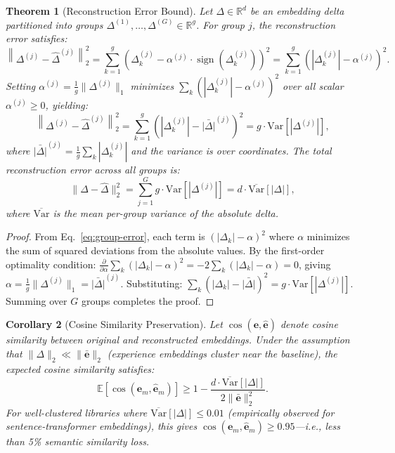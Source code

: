 \documentclass[11pt]{article}
\newtheorem{theorem}{Theorem}
\newtheorem{corollary}[theorem]{Corollary}
\DeclareMathOperator{\sign}{sign}
\begin{document}
\begin{theorem}[Reconstruction Error Bound]
\label{thm:reconstruction}
Let $\Delta \in \mathbb{R}^d$ be an embedding delta partitioned into groups
$\Delta^{(1)}, \ldots, \Delta^{(G)} \in \mathbb{R}^g$. For group $j$, the
reconstruction error satisfies:
\begin{equation}
    \left\|\Delta^{(j)} - \hat{\Delta}^{(j)}\right\|_2^2
    = \sum_{k=1}^{g} \left(\Delta_k^{(j)} - \alpha^{(j)} \cdot \sign(\Delta_k^{(j)})\right)^2
    = \sum_{k=1}^{g} \left(|\Delta_k^{(j)}| - \alpha^{(j)}\right)^2.
    \label{eq:group-error}
\end{equation}
Setting $\alpha^{(j)} = \frac{1}{g}\|\Delta^{(j)}\|_1$ minimizes
$\sum_k (|\Delta_k^{(j)}| - \alpha^{(j)})^2$ over all scalar $\alpha^{(j)} \geq 0$,
yielding:
\begin{equation}
    \left\|\Delta^{(j)} - \hat{\Delta}^{(j)}\right\|_2^2
    = \sum_{k=1}^{g} \left(|\Delta_k^{(j)}| - \bar{|\Delta|}^{(j)}\right)^2
    = g \cdot \mathrm{Var}\!\left[|\Delta^{(j)}|\right],
    \label{eq:var-error}
\end{equation}
where $\bar{|\Delta|}^{(j)} = \frac{1}{g}\sum_k |\Delta_k^{(j)}|$ and the variance
is over coordinates. The total reconstruction error across all groups is:
\begin{equation}
    \|\Delta - \hat{\Delta}\|_2^2 = \sum_{j=1}^{G} g \cdot \mathrm{Var}\!\left[|\Delta^{(j)}|\right]
    = d \cdot \overline{\mathrm{Var}}\!\left[|\Delta|\right],
\end{equation}
where $\overline{\mathrm{Var}}$ is the mean per-group variance of the absolute delta.
\end{theorem}

\begin{proof}
From Eq.~\eqref{eq:group-error}, each term is $(|\Delta_k| - \alpha)^2$ where
$\alpha$ minimizes the sum of squared deviations from the absolute values.
By the first-order optimality condition:
$\frac{\partial}{\partial \alpha} \sum_k (|\Delta_k| - \alpha)^2 = -2\sum_k(|\Delta_k| - \alpha) = 0$,
giving $\alpha = \frac{1}{g}\|\Delta^{(j)}\|_1 = \bar{|\Delta|}^{(j)}$.
Substituting: $\sum_k (|\Delta_k| - \bar{|\Delta|})^2 = g \cdot \mathrm{Var}[|\Delta^{(j)}|]$.
Summing over $G$ groups completes the proof.
\end{proof}

\begin{corollary}[Cosine Similarity Preservation]
\label{cor:cosine}
Let $\cos(\bm{e}, \hat{\bm{e}})$ denote cosine similarity between original
and reconstructed embeddings. Under the assumption that $\|\Delta\|_2 \ll
\|\bar{\bm{e}}\|_2$ (experience embeddings cluster near the baseline), the
expected cosine similarity satisfies:
\begin{equation}
    \mathbb{E}\left[\cos(\bm{e}_m, \hat{\bm{e}}_m)\right]
    \geq 1 - \frac{d \cdot \overline{\mathrm{Var}}[|\Delta|]}{2\|\bar{\bm{e}}\|_2^2}.
\end{equation}
For well-clustered libraries where $\overline{\mathrm{Var}}[|\Delta|] \leq 0.01$
(empirically observed for sentence-transformer embeddings), this gives
$\cos(\bm{e}_m, \hat{\bm{e}}_m) \geq 0.95$---i.e., less than 5\% semantic
similarity loss.
\end{corollary}
\end{document}
